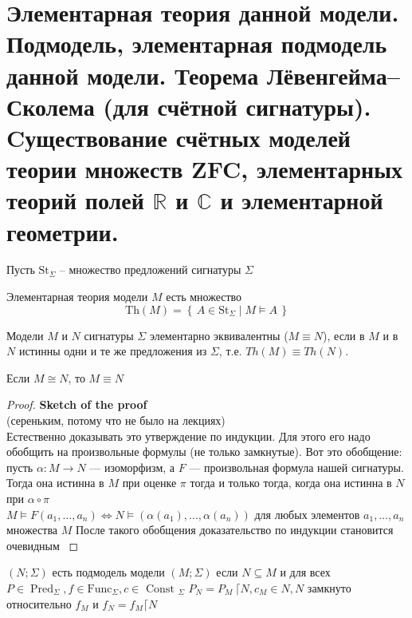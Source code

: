 \section{\texorpdfstring{Элементарная теория данной модели. Подмодель, элементарная подмодель данной модели.
Теорема Лёвенгейма–Сколема (для счётной сигнатуры). Cуществование счётных моделей теории множеств ZFC, элементарных
теорий полей $\mathbb{R}$ и $\mathbb{C}$ и элементарной геометрии.}{Элементарная теория модели. Подмодель,
элементарная подмодель. Теорема Левенгейма-Сколема. Существование счётных моделей ZFC, элементарных теорий полей
действительных и комплексных чисел и элементарной геометрии}}
Пусть $\mathrm{St}_\varSigma$ -- множество предложений сигнатуры $\varSigma$
\begin{definition}
	Элементарная теория модели $M$ есть множество $$\mathrm{Th}(M) = \left\{\,A \in \mathrm{St}_{\Sigma}\mid M
	\vDash A\,\right\}$$
\end{definition}
\begin{definition}
	Модели $M$ и $N$ сигнатуры $\varSigma$ элементарно эквивалентны ($M\equiv N$), если в $M$ и в $N$ истинны одни
	и те же предложения из $\varSigma$, т.е. $Th(M) \equiv Th(N)$.
\end{definition}
\begin{proposition}
	Если $M \cong N$, то $M \equiv N$
\end{proposition}
\begin{proof} \textcolor{mygray}{
		\textbf{Sketch of the proof} \\(сереньким, потому что не было на лекциях)\\
		Естественно доказывать это утверждение по индукции. Для
		этого его надо обобщить на произвольные формулы (не только замкнутые). Вот это обобщение: пусть $\alpha: M
		\rightarrow N$ — изоморфизм, а $F$ — произвольная формула нашей сигнатуры. Тогда она истинна в $M$ при
		оценке $\pi$ тогда и только тогда, когда она истинна в $N$ при $\alpha \circ \pi$\\
		$M  \models F\left(a_{1}, \ldots, a_{n}\right) \Leftrightarrow N  \models\left(\alpha\left(a_{1}\right),
		\ldots, \alpha\left(a_{n}\right)\right)$ для любых элементов $a_{1}, \dots, a_{n}$ множества $M$
		После такого обобщения доказательство по индукции становится
		очевидным
	}
\end{proof}
\begin{definition}
	$(N ; \Sigma)$  есть подмодель модели $(M ; \Sigma)$ если $N \subseteq M$ и для всех $P \in
	\operatorname{Pred}_{\Sigma}, f \in \mathrm{Func}_{\Sigma}, c \in \text { Const }_{\Sigma}$ $P_{N}=P_{M}\:
	\lceil N, c_{M} \in N, N$ замкнуто относительно $f_{M}$ и $f_{N}=f_{M}\lceil N$
\end{definition}
